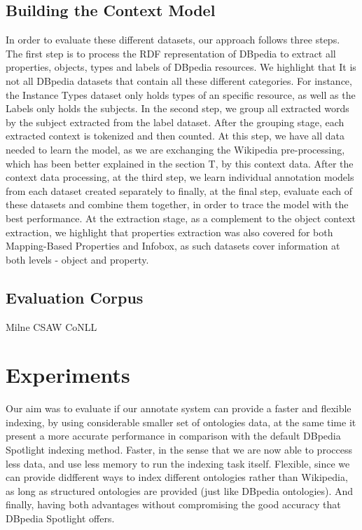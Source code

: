 \documentclass[10pt,a4paper]{article}
\begin{document}
\subsection{Building the Context Model}

In order to evaluate these different datasets, our approach follows three steps. The first step is to process the RDF representation of DBpedia to extract all properties, objects, types and labels of DBpedia resources. We highlight that It is not all DBpedia datasets that contain all these different categories. For instance, the Instance Types dataset only holds types of an specific resource, as well as the Labels only holds the subjects. In the second step, we group all extracted words by the subject extracted from the label dataset.
After the grouping stage, each extracted context is tokenized and then counted. At this step, we have all data needed to learn the model, as we are exchanging the Wikipedia pre-processing, which has been better explained in the section T, by this context data. After the context data processing, at the third step, we learn individual annotation models from each dataset created separately to finally, at the final step, evaluate each of these datasets and combine them together, in order to trace the model with the best performance.
At the extraction stage, as a complement to the object context extraction, we highlight that properties extraction was also covered for both Mapping-Based Properties and Infobox, as such datasets cover information at both levels - object and property.


\subsection{Evaluation Corpus}


Milne CSAW CoNLL

\section{Experiments}

Our aim was to evaluate if our annotate system can provide a faster and flexible indexing, by using considerable smaller set of ontologies data, at the same time it present a more accurate performance in comparison with the default DBpedia Spotlight indexing method. Faster, in the sense that  we are  now able to proccess less data, and use less memory to run the indexing task itself. Flexible, since we can provide didfferent ways to index different ontologies rather than Wikipedia, as long as structured ontologies are provided (just like DBpedia ontologies). And finally, having both advantages without compromising the good accuracy that DBpedia Spotlight offers.
\end{document}
